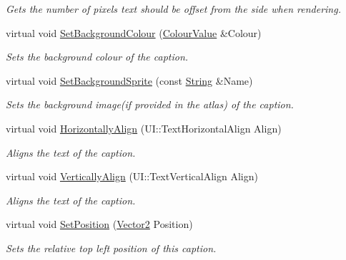 \begin{DoxyCompactItemize}
\begin{DoxyCompactList}\small\item\em Gets the number of pixels text should be offset from the side when rendering. \item\end{DoxyCompactList}\item 
virtual void \hyperlink{classphys_1_1UI_1_1Caption_a73dc9d896640bc1fc9ab6584bfb86a7c}{SetBackgroundColour} (\hyperlink{classphys_1_1ColourValue}{ColourValue} \&Colour)
\begin{DoxyCompactList}\small\item\em Sets the background colour of the caption. \item\end{DoxyCompactList}\item 
virtual void \hyperlink{classphys_1_1UI_1_1Caption_a98422dc633dfb68ea87d0f54fda25f48}{SetBackgroundSprite} (const \hyperlink{namespacephys_aa03900411993de7fbfec4789bc1d392e}{String} \&Name)
\begin{DoxyCompactList}\small\item\em Sets the background image(if provided in the atlas) of the caption. \item\end{DoxyCompactList}\item 
virtual void \hyperlink{classphys_1_1UI_1_1Caption_a1b7d2736ee545f518c33f0cd99a4ef0a}{HorizontallyAlign} (UI::TextHorizontalAlign Align)
\begin{DoxyCompactList}\small\item\em Aligns the text of the caption. \item\end{DoxyCompactList}\item 
virtual void \hyperlink{classphys_1_1UI_1_1Caption_adb3936d7eea2137e60943825acf4a5d0}{VerticallyAlign} (UI::TextVerticalAlign Align)
\begin{DoxyCompactList}\small\item\em Aligns the text of the caption. \item\end{DoxyCompactList}\item 
virtual void \hyperlink{classphys_1_1UI_1_1Caption_a3428c4f67c085ccc93c977f964b51a33}{SetPosition} (\hyperlink{classphys_1_1Vector2}{Vector2} Position)
\begin{DoxyCompactList}\small\item\em Sets the relative top left position of this caption. \item\end{DoxyCompactList}\item 

\end{DoxyCompactItemize}

